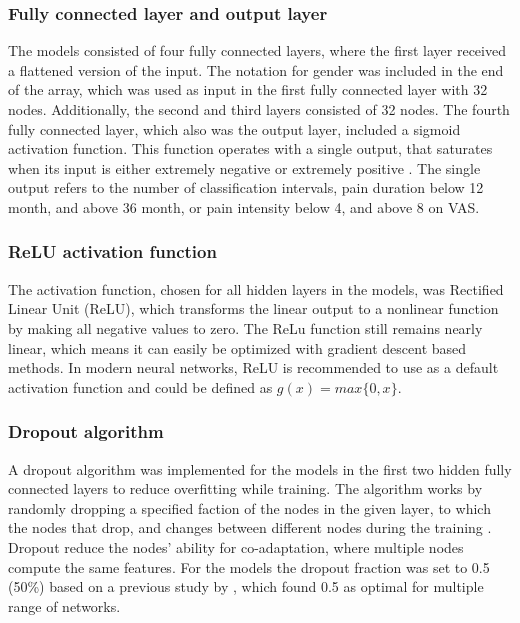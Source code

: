 \subsubsection{Fully connected layer and output layer}
The models consisted of four fully connected layers, where the first layer received a flattened version of the input. The notation for gender was included in the end of the array, which was used as input in the first fully connected layer with 32 nodes. Additionally, the second and third layers consisted of 32 nodes. The fourth fully connected layer, which also was the output layer, included a sigmoid activation function. 
This function operates with a single output, that saturates when its input is either extremely negative or extremely positive \citep{Goodfellow2016}. The single output refers to the number of classification intervals, pain duration below 12 month, and above 36 month, or pain intensity below 4, and above 8 on VAS. 

\subsubsection{ReLU activation function}
The activation function, chosen for all hidden layers in the models, was Rectified Linear Unit (ReLU), which transforms the linear output to a nonlinear function by making all negative values to zero. The ReLu function still remains nearly linear, which means it can easily be optimized with gradient descent based methods. In modern neural networks, ReLU is recommended to use as a default activation function and could be defined as $g(x) = max\{0, x\}$.\citep{Goodfellow2016}

\subsubsection{Dropout algorithm}
A dropout algorithm was implemented for the models in the first two hidden fully connected layers to reduce overfitting while training. The algorithm works by randomly dropping a specified faction of the nodes in the given layer, to which the nodes that drop, and changes between different nodes during the training \citep{Srivastava2014}. Dropout reduce the nodes’ ability for co-adaptation, where multiple nodes compute the same features. For the models the dropout fraction was set to 0.5 (50\%) based on a previous study by \citeauthor{Srivastava2014} \citep{Srivastava2014}, which found 0.5 as optimal for multiple range of networks.

